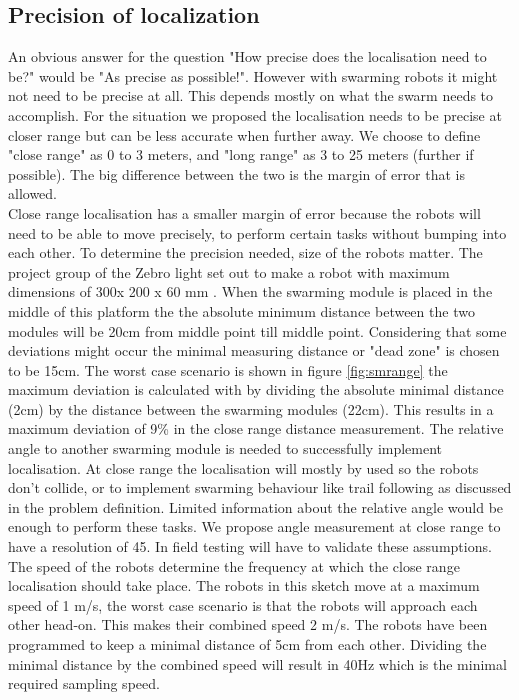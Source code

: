 \documentclass[10pt,a4paper]{article}
\begin{document}
\subsection{Precision of localization}
An obvious answer for the question "How precise does the localisation need to be?" would be "As precise as possible!". However with swarming robots it might not need to be precise at all. This depends mostly on what the swarm needs to accomplish. For the situation we proposed the localisation needs to be precise at closer range but can be less accurate when further away. We choose to define "close range" as 0 to 3 meters, and "long range" as 3 to 25 meters (further if possible).  The big difference between the two is the margin of error that is allowed. \\

Close range localisation has a smaller margin of error because the robots will need to be able to move precisely, to perform certain tasks without bumping into each other. To determine the precision needed, size of the robots matter.  The project group of the Zebro light set out to make a robot with maximum dimensions of  300x 200 x 60 mm \cite{zebrolight}. When the swarming module is placed in the middle of this platform the the absolute minimum distance between the two modules will be 20cm from middle point till middle point. Considering that some deviations might occur the minimal measuring distance or "dead zone" is chosen to be 15cm. The worst case scenario is shown in figure \ref{fig:smrange} the maximum deviation is calculated with by dividing the absolute minimal distance (2cm) by the distance between the swarming modules (22cm). This results in a maximum deviation of 9\% in the close range distance measurement. The relative angle to another swarming module is needed to successfully implement localisation. At close range the localisation will mostly by used so the robots don't collide, or to implement swarming behaviour like trail following as discussed in the problem definition. Limited information about the relative angle would be enough to perform these tasks. We propose angle measurement at close range to have a resolution of 45\degree. In field testing will have to validate these assumptions. The speed of the robots determine the frequency at which the close range localisation should take place. The robots in this sketch move at a maximum speed of 1 m/s, the worst case scenario is that the robots will approach each other head-on. This makes their combined speed 2 m/s. The robots have been programmed to keep a minimal distance of 5cm from each other. Dividing the minimal distance by the combined speed will result in 40Hz which is the minimal required sampling speed. \\
\end{document}
